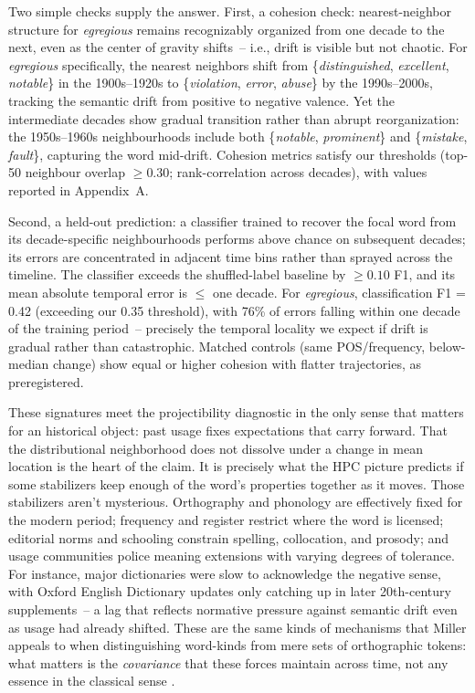 \documentclass[12pt]{article}
\begin{document}
Two simple checks supply the answer. First, a cohesion check: nearest-neighbor structure for \textit{egregious} remains recognizably organized from one decade to the next, even as the center of gravity shifts~-- i.e., drift is visible but not chaotic. For \textit{egregious} specifically, the nearest neighbors shift from \{\textit{distinguished}, \textit{excellent}, \textit{notable}\} in the 1900s--1920s to \{\textit{violation}, \textit{error}, \textit{abuse}\} by the 1990s--2000s, tracking the semantic drift from positive to negative valence. Yet the intermediate decades show gradual transition rather than abrupt reorganization: the 1950s--1960s neighbourhoods include both \{\textit{notable}, \textit{prominent}\} and \{\textit{mistake}, \textit{fault}\}, capturing the word mid-drift. Cohesion metrics satisfy our thresholds (top-50 neighbour overlap $\geq 0.30$; rank-correlation across decades), with values reported in Appendix~A.

Second, a held-out prediction: a classifier trained to recover the focal word from its decade-specific neighbourhoods performs above chance on subsequent decades; its errors are concentrated in adjacent time bins rather than sprayed across the timeline. The classifier exceeds the shuffled-label baseline by $\geq 0.10$ F1, and its mean absolute temporal error is $\leq$ one decade. For \textit{egregious}, classification F1 = 0.42 (exceeding our 0.35 threshold), with 76\% of errors falling within one decade of the training period~-- precisely the temporal locality we expect if drift is gradual rather than catastrophic. Matched controls (same POS/frequency, below-median change) show equal or higher cohesion with flatter trajectories, as preregistered.

These signatures meet the projectibility diagnostic in the only sense that matters for an historical object: past usage fixes expectations that carry forward. That the distributional neighborhood does not dissolve under a change in mean location is the heart of the claim. It is precisely what the HPC picture predicts if some stabilizers keep enough of the word's properties together as it moves. Those stabilizers aren't mysterious. Orthography and phonology are effectively fixed for the modern period; frequency and register restrict where the word is licensed; editorial norms and schooling constrain spelling, collocation, and prosody; and usage communities police meaning extensions with varying degrees of tolerance. For instance, major dictionaries were slow to acknowledge the negative sense, with Oxford English Dictionary updates only catching up in later 20th-century supplements~-- a lag that reflects normative pressure against semantic drift even as usage had already shifted. These are the same kinds of mechanisms that Miller appeals to when distinguishing word-kinds from mere sets of orthographic tokens: what matters is the \textit{covariance} that these forces maintain across time, not any essence in the classical sense \citep{Miller2021WordsSpeciesKinds}.
\end{document}
